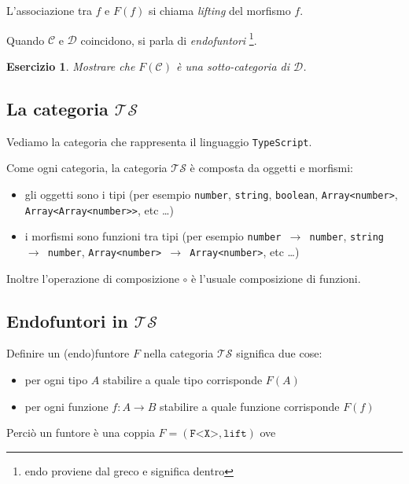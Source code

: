 \documentclass[12pt]{article}
\newtheorem{exercise}{Esercizio}[section]
\begin{document}
L'associazione tra $f$ e $F(f)$ si chiama \emph{lifting} del morfismo $f$.

Quando $\mathcal{C}$ e $\mathcal{D}$ coincidono, si parla di \emph{endofuntori} \footnote{endo proviene dal greco e significa dentro}.

\begin{exercise}
Mostrare che $F(\mathcal{C})$ è una sotto-categoria di $\mathcal{D}$.
\end{exercise}

\subsection{La categoria $\mathcal{TS}$}

Vediamo la categoria che rappresenta il linguaggio \texttt{TypeScript}.

Come ogni categoria, la categoria $\mathcal{TS}$ è composta da oggetti e morfismi:

\begin{itemize}
  \item gli oggetti sono i tipi (per esempio \texttt{number}, \texttt{string}, \texttt{boolean}, \texttt{Array<number>}, \texttt{Array<Array<number>>}, etc \ldots)
  \item i morfismi sono funzioni tra tipi (per esempio \texttt{number $\rightarrow$ number}, \texttt{string $\rightarrow$ number}, \texttt{Array<number> $\rightarrow$ Array<number>}, etc \ldots)
\end{itemize}

Inoltre l'operazione di composizione $\circ$ è l'usuale composizione di funzioni.

\subsection{Endofuntori in $\mathcal{TS}$}

Definire un (endo)funtore $F$ nella categoria $\mathcal{TS}$ significa due cose:

\begin{itemize}
  \item per ogni tipo $A$ stabilire a quale tipo corrisponde $F(A)$
  \item per ogni funzione $f: A \rightarrow B$ stabilire a quale funzione corrisponde $F(f)$
\end{itemize}

Perciò un funtore è una coppia $F = (\texttt{F<X>}, \texttt{lift})$ ove
\end{document}
